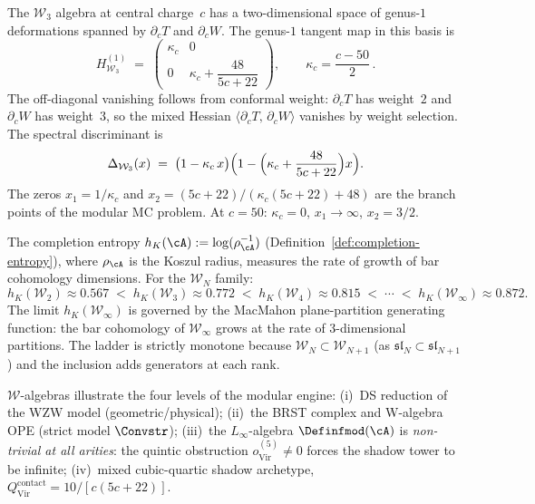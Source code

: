 \begin{computation}
\label{comp:w3-genus1-hessian}
The $\mathcal W_3$ algebra at central charge~$c$ has a
two-dimensional space of genus-$1$ deformations spanned by
$\partial_c T$ and $\partial_c W$.  The genus-$1$ tangent map
in this basis is
\[
H^{(1)}_{\mathcal W_3}
\;=\;
\begin{pmatrix}
\kappa_c & 0 \\[2pt]
0 & \kappa_c + \dfrac{48}{5c+22}
\end{pmatrix},
\qquad
\kappa_c = \frac{c-50}{2}\,.
\]
The off-diagonal vanishing follows from conformal weight:
$\partial_c T$ has weight~$2$ and $\partial_c W$ has weight~$3$,
so the mixed Hessian $\langle\partial_c T,\,\partial_c W\rangle$
vanishes by weight selection.
The spectral discriminant is
\[
\Delta_{\mathcal W_3}(x)
\;=\;
\bigl(1-\kappa_c\,x\bigr)
\Bigl(1-\Bigl(\kappa_c+\frac{48}{5c+22}\Bigr)x\Bigr).
\]
The zeros $x_1 = 1/\kappa_c$ and
$x_2 = (5c+22)/(\kappa_c(5c+22)+48)$ are the branch points
of the modular MC problem.  At $c=50$: $\kappa_c=0$,
$x_1\to\infty$, $x_2=3/2$.
\end{computation}

\begin{computation}
\label{comp:w-entropy-ladder}
The completion entropy
$h_K(\cA) := \log(\rho_\cA^{-1})$
(Definition~\ref{def:completion-entropy}),
where $\rho_\cA$ is the Koszul radius, measures the rate
of growth of bar cohomology dimensions.  For the
$\mathcal W_N$ family:
\[
h_K(\mathcal W_2) \approx 0.567
\;<\;
h_K(\mathcal W_3) \approx 0.772
\;<\;
h_K(\mathcal W_4) \approx 0.815
\;<\;\cdots\;<\;
h_K(\mathcal W_\infty) \approx 0.872.
\]
The limit $h_K(\mathcal W_\infty)$ is governed by the
MacMahon plane-partition generating function: the bar cohomology
of $\mathcal W_\infty$ grows at the rate of $3$-dimensional
partitions.  The ladder is strictly monotone because
$\mathcal W_N \subset \mathcal W_{N+1}$ (as
$\mathfrak{sl}_N \subset \mathfrak{sl}_{N+1}$) and the
inclusion adds generators at each rank.
\end{computation}

\begin{remark}
\label{rem:w-four-level}
$\mathcal{W}$-algebras illustrate the four levels of the modular
engine:
(i)~DS reduction of the WZW model (geometric/physical);
(ii)~the BRST complex and W-algebra OPE (strict model $\Convstr$);
(iii)~the $L_\infty$-algebra $\Definfmod(\cA)$ is \emph{non-trivial
at all arities}: the quintic obstruction $o^{(5)}_{\mathrm{Vir}}
\neq 0$ forces the shadow tower to be infinite;
(iv)~mixed cubic-quartic shadow archetype,
$Q^{\mathrm{contact}}_{\mathrm{Vir}} = 10/[c(5c+22)]$.
\end{remark}

